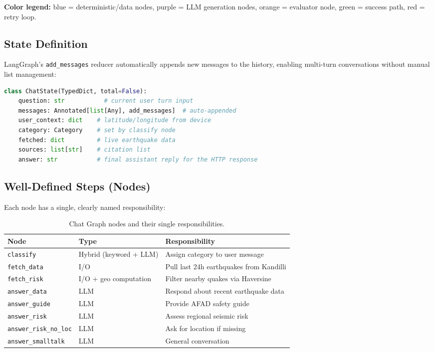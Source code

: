 \documentclass[11pt,a4paper]{article}
\begin{document}
\begin{designnote}
\textbf{Color legend:} blue = deterministic/data nodes, purple = LLM generation nodes, orange = evaluator node, green = success path, red = retry loop.
\end{designnote}

\subsection{State Definition}

LangGraph's \texttt{add\_messages} reducer automatically appends new messages to the history, enabling multi-turn conversations without manual list management:

\begin{lstlisting}[style=codestyle, language=Python]
class ChatState(TypedDict, total=False):
    question: str           # current user turn input
    messages: Annotated[list[Any], add_messages]  # auto-appended
    user_context: dict    # latitude/longitude from device
    category: Category    # set by classify node
    fetched: dict         # live earthquake data
    sources: list[str]    # citation list
    answer: str           # final assistant reply for the HTTP response
\end{lstlisting}

\subsection{Well-Defined Steps (Nodes)}

Each node has a single, clearly named responsibility:

\begin{table}[H]
\centering
\begin{tabular}{@{}lll@{}}
\toprule
\textbf{Node} & \textbf{Type} & \textbf{Responsibility} \\
\midrule
\texttt{classify}          & Hybrid (keyword + LLM) & Assign category to user message \\
\texttt{fetch\_data}       & I/O                    & Pull last 24h earthquakes from Kandilli \\
\texttt{fetch\_risk}       & I/O + geo computation  & Filter nearby quakes via Haversine \\
\texttt{answer\_data}      & LLM                    & Respond about recent earthquake data \\
\texttt{answer\_guide}     & LLM                    & Provide AFAD safety guide \\
\texttt{answer\_risk}      & LLM                    & Assess regional seismic risk \\
\texttt{answer\_risk\_no\_loc} & LLM               & Ask for location if missing \\
\texttt{answer\_smalltalk} & LLM                    & General conversation \\
\bottomrule
\end{tabular}
\caption{Chat Graph nodes and their single responsibilities.}
\end{table}
\end{document}
